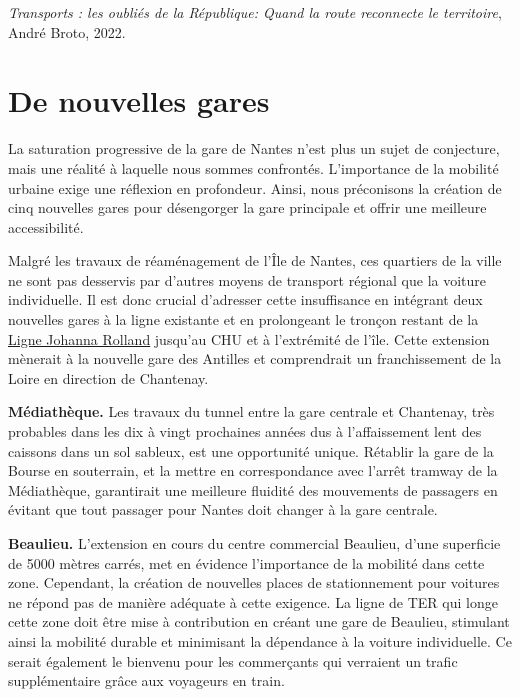 
\textit{Transports : les oubliés de la République: Quand la route reconnecte le territoire}, André Broto, 2022.


\section{De nouvelles gares}

La saturation progressive de la gare de Nantes n’est plus un sujet de
conjecture, mais une réalité à laquelle nous sommes
confrontés. L’importance de la mobilité urbaine exige une réflexion en
profondeur. Ainsi, nous préconisons la création de cinq nouvelles
gares pour désengorger la gare principale et offrir une meilleure
accessibilité.

Malgré les travaux de réaménagement de l'Île de Nantes, ces quartiers
de la ville ne sont pas desservis par d'autres moyens de transport
régional que la voiture individuelle. Il est donc crucial d'adresser
cette insuffisance en intégrant deux nouvelles gares à la ligne
existante et en prolongeant le tronçon restant de la
\href{https://www.mobilitains.fr/tb/t/ligne-johanna-rolland-2021/}{Ligne
  Johanna Rolland} jusqu'au CHU et à l'extrémité de l'île. Cette
extension mènerait à la nouvelle gare des Antilles et comprendrait un
franchissement de la Loire en direction de Chantenay.

\textbf{Médiathèque.} Les travaux du tunnel entre la gare centrale et
Chantenay, très probables dans les dix à vingt prochaines années dus à
l'affaissement lent des caissons dans un sol sableux, est une
opportunité unique. Rétablir la gare de la Bourse en souterrain, et la
mettre en correspondance avec l'arrêt tramway de la Médiathèque,
garantirait une meilleure fluidité des mouvements de passagers en
évitant que tout passager pour Nantes doit changer à la gare centrale.

\textbf{Beaulieu.}
L'extension en cours du centre commercial Beaulieu, d'une superficie
de 5000 mètres carrés, met en évidence l'importance de la mobilité
dans cette zone. Cependant, la création de nouvelles places de
stationnement pour voitures ne répond pas de manière adéquate à cette
exigence. La ligne de TER qui longe cette zone doit être mise à
contribution en créant une gare de Beaulieu, stimulant ainsi la
mobilité durable et minimisant la dépendance à la voiture
individuelle.  Ce serait également le bienvenu pour les commerçants
qui verraient un trafic supplémentaire grâce aux voyageurs en train.


